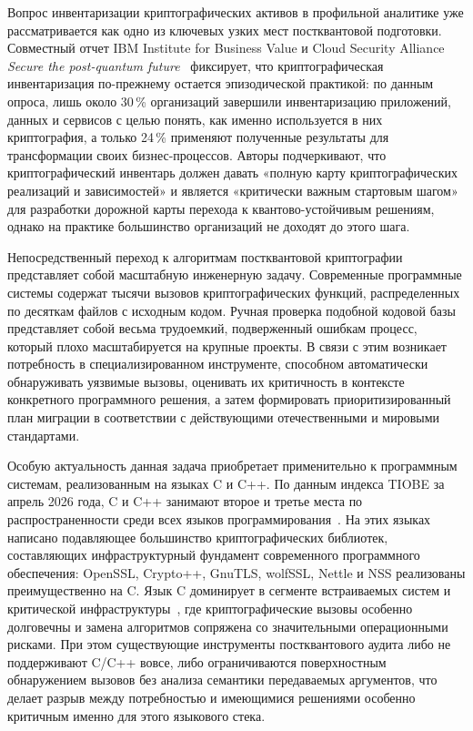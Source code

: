 \documentclass{itmo-vkr}
\begin{document}
	Вопрос инвентаризации криптографических активов в профильной аналитике уже рассматривается как одно из ключевых узких мест постквантовой подготовки. Совместный отчет IBM Institute for Business Value и Cloud Security Alliance \textit{Secure the post-quantum future}~\cite{IBM_Secure_PQ_2025} фиксирует, что криптографическая инвентаризация по-прежнему остается эпизодической практикой: по данным опроса, лишь около 30\,\% организаций завершили инвентаризацию приложений, данных и сервисов с целью понять, как именно используется в них криптография, а только 24\,\% применяют полученные результаты для трансформации своих бизнес-процессов. Авторы подчеркивают, что криптографический инвентарь должен давать «полную карту криптографических реализаций и зависимостей» и является «критически важным стартовым шагом» для разработки дорожной карты перехода к квантово-устойчивым решениям, однако на практике большинство организаций не доходят до этого шага.
	
	Непосредственный переход к алгоритмам постквантовой криптографии представляет собой масштабную инженерную задачу. Современные программные системы содержат тысячи вызовов криптографических функций, распределенных по десяткам файлов с исходным кодом. Ручная проверка подобной кодовой базы представляет собой весьма трудоемкий, подверженный ошибкам процесс, который плохо масштабируется на крупные проекты. В связи с этим возникает потребность в специализированном инструменте, способном автоматически обнаруживать уязвимые вызовы, оценивать их критичность в контексте конкретного программного решения, а затем формировать приоритизированный план миграции в соответствии с действующими отечественными и мировыми стандартами.
	
	Особую актуальность данная задача приобретает применительно к программным
	системам, реализованным на языках C и C++. По данным индекса TIOBE за апрель
	2026 года, C и C++ занимают второе и третье места по распространенности среди
	всех языков программирования~\cite{tiobe2026}. На этих языках написано
	подавляющее большинство криптографических библиотек, составляющих
	инфраструктурный фундамент современного программного обеспечения: OpenSSL,
	Crypto++, GnuTLS, wolfSSL, Nettle и NSS реализованы преимущественно на
	C. Язык C доминирует в сегменте встраиваемых систем и
	критической инфраструктуры~\cite{embedded-sw-market}, где криптографические
	вызовы особенно долговечны и замена алгоритмов сопряжена со значительными
	операционными рисками. При этом существующие инструменты постквантового
	аудита либо не поддерживают C/C++ вовсе, либо ограничиваются поверхностным
	обнаружением вызовов без анализа семантики передаваемых аргументов, что
	делает разрыв между потребностью и имеющимися решениями особенно критичным
	именно для этого языкового стека.
	
\end{document}
